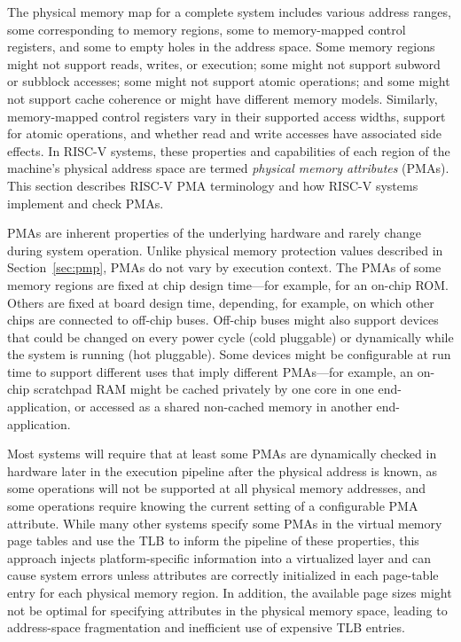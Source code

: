 The physical memory map for a complete system includes various address
ranges, some corresponding to memory regions, some to memory-mapped
control registers, and some to empty holes in the address space.  Some
memory regions might not support reads, writes, or execution; some
might not support subword or subblock accesses; some might not support
atomic operations; and some might not support cache coherence or might
have different memory models.  Similarly, memory-mapped control
registers vary in their supported access widths, support for atomic
operations, and whether read and write accesses have associated side
effects.  In RISC-V systems, these properties and capabilities of each
region of the machine's physical address space are termed {\em
  physical memory attributes} (PMAs).  This section describes RISC-V
PMA terminology and how RISC-V systems implement and check PMAs.

PMAs are inherent properties of the underlying hardware and rarely
change during system operation.  Unlike physical memory protection
values described in Section~\ref{sec:pmp}, PMAs do not vary by
execution context.  The PMAs of some memory regions are fixed at chip
design time---for example, for an on-chip ROM.  Others are fixed at
board design time, depending, for example, on which other chips are
connected to off-chip buses.  Off-chip buses might also support
devices that could be changed on every power cycle (cold pluggable) or
dynamically while the system is running (hot pluggable).  Some devices
might be configurable at run time to support different uses that imply
different PMAs---for example, an on-chip scratchpad RAM might be
cached privately by one core in one end-application, or accessed as a
shared non-cached memory in another end-application.

Most systems will require that at least some PMAs are dynamically
checked in hardware later in the execution pipeline after the physical
address is known, as some operations will not be supported at all
physical memory addresses, and some operations require knowing the
current setting of a configurable PMA attribute.  While many other systems
specify some PMAs in the virtual memory page tables and use the TLB to
inform the pipeline of these properties, this approach injects platform-specific
information into a virtualized layer and can cause system errors
unless attributes are correctly initialized in each page-table entry
for each physical memory region.  In addition, the available
page sizes might not be optimal for specifying attributes in the
physical memory space, leading to address-space fragmentation and
inefficient use of expensive TLB entries.

